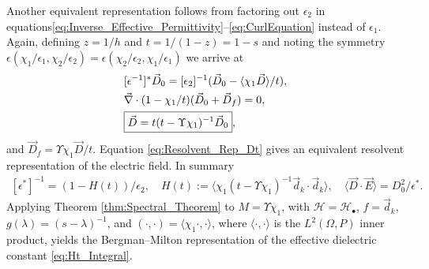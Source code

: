 \documentclass[english,12pt]{ttuthes}
\begin{document}
Another equivalent representation follows from factoring out $\epsilon_2$ in
equations\eqref{eq:Inverse_Effective_Permittivity}--\eqref{eq:CurlEquation}  
instead of $\epsilon_1$. Again, defining $z = 1/h$ and $t=1/(1-z)=1-s$ and noting
the symmetry  $\epsilon(\chi_1/\epsilon_1,\chi_2/\epsilon_2)=\epsilon(\chi_2/\epsilon_2,\chi_1/\epsilon_1)$ we arrive at 
%
\begin{align}\label{eq:Resolvent_Rep_Dt}
   &[\epsilon^{-1}]^*\vec{D}_0=[\epsilon_2]^{-1}(\vec{D}_0-\langle\chi_1\vec{D}\rangle/t),\notag\\
    &\vec{\nabla}\cdot(1-\chi_1/t)(\vec{D}_0+\vec{D}_f)=0,\notag\\
    &\boxed{\vec{D}=t(t-\Upsilon\chi_1)^{-1}\vec{D}_0},
\end{align}
%
and $\vec{D}_f=\Upsilon\chi_1\vec{D}/t$. Equation
\eqref{eq:Resolvent_Rep_Dt} gives an equivalent resolvent
representation of the electric field. In summary
%
\begin{align}\label{eq:Herglotz_Energy_Rep_Dt}
  [\epsilon^*]^{-1}=(1-H(t))/\epsilon_2,\quad
  H(t):=\langle\chi_1(t-\Upsilon\chi_1)^{-1}\vec{d}_k\cdot\vec{d}_k\rangle, \quad
  \langle\vec{D}\cdot\vec{E}\rangle=D_0^2/\epsilon^*.
\end{align}
%
Applying Theorem \ref{thm:Spectral_Theorem} to $M=\Upsilon\chi_1$,
with $\mathscr{H}=\mathscr{H}_\bullet$, $f=\vec{d}_k$,
$g(\lambda)=(s-\lambda)^{-1}$, and  $(\cdot,\cdot)=\langle\chi_1\cdot,\cdot\rangle$, where $\langle\cdot,\cdot\rangle$ is the $L^2(\Omega,P)$
inner product, yields the Bergman--Milton representation of the
effective dielectric constant \eqref{eq:Ht_Integral}.
\end{document}
